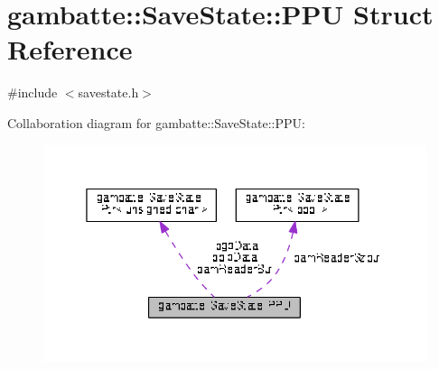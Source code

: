 \hypertarget{structgambatte_1_1SaveState_1_1PPU}{}\section{gambatte\+:\+:Save\+State\+:\+:P\+PU Struct Reference}
\label{structgambatte_1_1SaveState_1_1PPU}


{\ttfamily \#include $<$savestate.\+h$>$}



Collaboration diagram for gambatte\+:\+:Save\+State\+:\+:P\+PU\+:\nopagebreak
\begin{figure}[H]
\begin{center}
\leavevmode
\includegraphics[width=350pt]{structgambatte_1_1SaveState_1_1PPU__coll__graph}
\end{center}
\end{figure}
